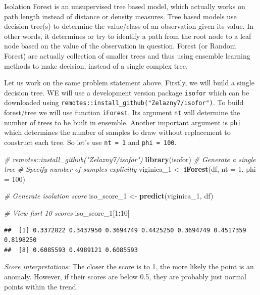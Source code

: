 \documentclass[
]{book}
\newenvironment{Shaded}{\begin{snugshade}}{\end{snugshade}}
\newcommand{\AttributeTok}[1]{\textcolor[rgb]{0.13,0.29,0.53}{#1}}
\newcommand{\CommentTok}[1]{\textcolor[rgb]{0.56,0.35,0.01}{\textit{#1}}}
\newcommand{\DecValTok}[1]{\textcolor[rgb]{0.00,0.00,0.81}{#1}}
\newcommand{\FunctionTok}[1]{\textcolor[rgb]{0.13,0.29,0.53}{\textbf{#1}}}
\newcommand{\NormalTok}[1]{#1}
\newcommand{\OtherTok}[1]{\textcolor[rgb]{0.56,0.35,0.01}{#1}}
\newcommand{\SpecialCharTok}[1]{\textcolor[rgb]{0.81,0.36,0.00}{\textbf{#1}}}
\begin{document}
Isolation Forest is an unsupervised tree based model, which actually works on path length instead of distance or density measures. Tree based models use decision tree(s) to determine the value/class of an observation given its value. In other words, it determines or try to identify a path from the root node to a leaf node based on the value of the observation in question. Forest (or Random Forest) are actually collection of smaller trees and thus using ensemble learning methods to make decision, instead of a single complex tree.

Let us work on the same problem statement above. Firstly, we will build a single decision tree. WE will use a development version package \texttt{isofor} which can be downloaded using \texttt{remotes::install\_github("Zelazny7/isofor")}. To build forest/tree we will use function \texttt{iForest}. Its argument \texttt{nt} will determine the number of trees to be built in ensemble. Another important argument is \texttt{phi} which determines the number of samples to draw without replacement to construct each tree. So let's use \texttt{nt\ =\ 1} and \texttt{phi\ =\ 100}.

\begin{Shaded}
\begin{Highlighting}[]
\CommentTok{\# remotes::install\_github("Zelazny7/isofor")}
\FunctionTok{library}\NormalTok{(isofor)}
\CommentTok{\# Generate a single tree}
\CommentTok{\# Specify number of samples explicitly}
\NormalTok{viginica\_1 }\OtherTok{\textless{}{-}} \FunctionTok{iForest}\NormalTok{(df, }\AttributeTok{nt =} \DecValTok{1}\NormalTok{, }\AttributeTok{phi =} \DecValTok{100}\NormalTok{)}

\CommentTok{\# Generate isolation score}
\NormalTok{iso\_score\_1 }\OtherTok{\textless{}{-}} \FunctionTok{predict}\NormalTok{(viginica\_1, df)}

\CommentTok{\# View fisrt 10 scores}
\NormalTok{iso\_score\_1[}\DecValTok{1}\SpecialCharTok{:}\DecValTok{10}\NormalTok{]}
\end{Highlighting}
\end{Shaded}

\begin{verbatim}
##  [1] 0.3372822 0.3437950 0.3694749 0.4425250 0.3694749 0.4517359 0.8198250
##  [8] 0.6085593 0.4989121 0.6085593
\end{verbatim}

\emph{Score interpretations}: The closer the score is to 1, the more likely the point is an anomaly. However, if their scores are below 0.5, they are probably just normal points within the trend.
\end{document}
